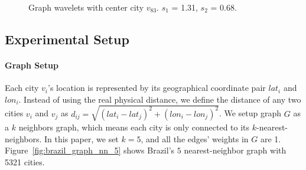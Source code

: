 \documentclass[twoside,leqno,twocolumn]{article}
\begin{document}


\begin{figure}[t]
	\centering
    \vspace{-2mm}
	\caption{Graph wavelets with center city $v_{83}$. $s_1$ = 1.31, $s_2$ = 0.68.}
	\label{fig:graphwaveletscale}
\end{figure}

\subsection{Experimental Setup}
\label{sec:experimental_setup}

\paragraph{Graph Setup}
Each city $v_i$'s location is represented by its geographical coordinate pair $lat_i$ and $lon_i$. Instead of using the real physical distance, we define the distance of any two cities $v_i$ and $v_j$ as $d_{ij}=\sqrt{(lat_i-lat_j)^2+(lon_i-lon_j)^2}$. We setup graph $G$ as a $k$ neighbors graph, which means  each city is only  connected to its $k$-nearest-neighbors. In this paper, we set $k=5$, and all the edges' weights  in $G$ are 1. Figure~\ref{fig:brazil_graph_nn_5} shows Brazil's $5$ nearest-neighbor graph with 5321 cities.
\end{document}
